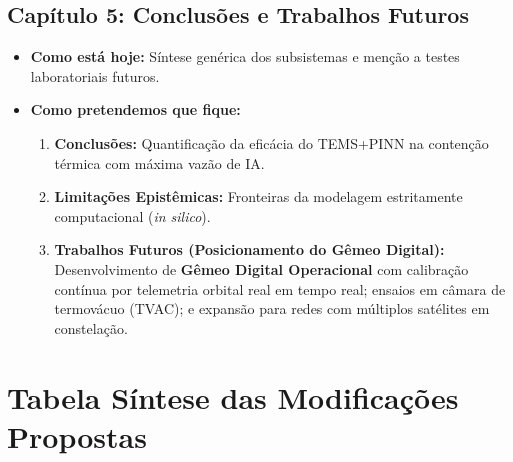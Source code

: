 \documentclass[11pt,a4paper]{article}
\begin{document}
\subsection*{Capítulo 5: Conclusões e Trabalhos Futuros}
\begin{itemize}[leftmargin=1.2em, itemsep=2pt, parsep=0pt]
    \item \textbf{Como está hoje:} Síntese genérica dos subsistemas e menção a testes laboratoriais futuros.
    \item \textbf{Como pretendemos que fique:}
    \begin{enumerate}[label=\alph*., itemsep=1pt, parsep=0pt]
        \item \textbf{Conclusões:} Quantificação da eficácia do TEMS+PINN na contenção térmica com máxima vazão de IA.
        \item \textbf{Limitações Epistêmicas:} Fronteiras da modelagem estritamente computacional (\textit{in silico}).
        \item \textbf{Trabalhos Futuros (Posicionamento do Gêmeo Digital):} Desenvolvimento de \textbf{Gêmeo Digital Operacional} com calibração contínua por telemetria orbital real em tempo real; ensaios em câmara de termovácuo (TVAC); e expansão para redes com múltiplos satélites em constelação.
    \end{enumerate}
\end{itemize}

\vspace{4pt}
\section{Tabela Síntese das Modificações Propostas}
\end{document}
